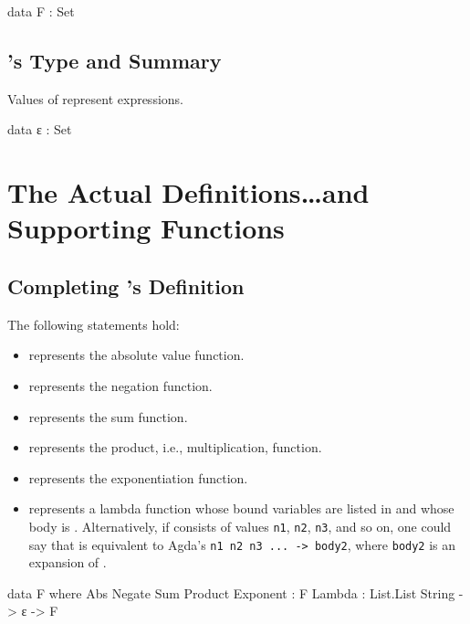 \documentclass{report}
\begin{document}
\begin{code}
data F : Set
\end{code}

\subsection{'s Type and Summary}
Values of  represent expressions.

\begin{code}
data ε : Set
\end{code}

\section{The Actual Definitions\ldots and Supporting Functions}

\subsection{Completing 's Definition}
The following statements hold:

\begin{itemize}
  \item {} represents the absolute value function.
  \item {} represents the negation function.
  \item {} represents the sum function.
  \item {} represents the product, i.e., multiplication, function.
  \item {} represents the exponentiation function.
  \item {}   represents a lambda function whose bound variables are listed in  and whose body is .  Alternatively, if  consists of values \texttt{n1}, \texttt{n2}, \texttt{n3}, and so on, one could say that    is equivalent to Agda's \texttt{\textasciibackslash n1 n2 n3 ... -> body2}, where \texttt{body2} is an expansion of .
\end{itemize}

\begin{code}
data F where
  Abs
   Negate
   Sum
   Product
   Exponent : F
  Lambda : List.List String -> ε -> F
\end{code}
\end{document}
